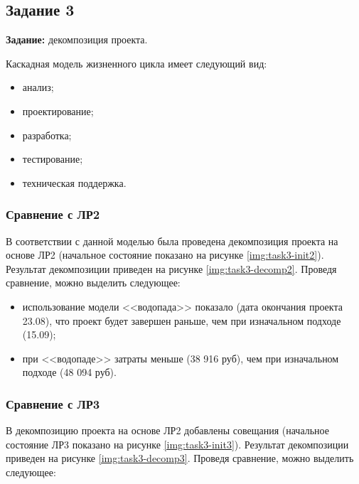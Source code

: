 

\clearpage
\subsection{Задание 3}

\textbf{Задание:} декомпозиция проекта.

Каскадная модель жизненного цикла имеет следующий вид:

\begin{itemize}
    \item анализ;
    \item проектирование;
    \item разработка;
    \item тестирование;
    \item техническая поддержка.
\end{itemize}

\subsubsection{Сравнение с ЛР2}

В соответствии с данной моделью была проведена декомпозиция проекта на основе ЛР2 (начальное состояние показано на рисунке \ref{img:task3-init2}). Результат декомпозиции приведен на рисунке \ref{img:task3-decomp2}. Проведя сравнение, можно выделить следующее:

\begin{itemize}
    \item использование модели <<водопада>> показало (дата окончания проекта 23.08), что проект будет завершен раньше, чем при изначальном подходе (15.09);
    \item при <<водопаде>> затраты меньше (38 916 руб), чем при изначальном подходе (48 094 руб).
\end{itemize}



\subsubsection{Сравнение с ЛР3}

В декомпозицию проекта на основе ЛР2 добавлены совещания (начальное состояние ЛР3 показано на рисунке \ref{img:task3-init3}). Результат декомпозиции приведен на рисунке \ref{img:task3-decomp3}. Проведя сравнение, можно выделить следующее:

